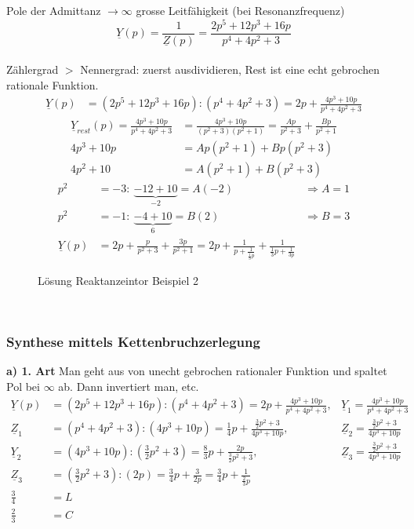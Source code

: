 Pole der Admittanz $\rightarrow \infty$ grosse Leitfähigkeit (bei
Resonanzfrequenz)\\
$$\underline{Y}(p)=\frac{1}{\underline{Z}(p)}=\frac{2p^5+12p^3+16p}{p^4+4p^2+3}$$\\
Zählergrad $>$ Nennergrad: zuerst ausdividieren, Rest ist eine echt gebrochen
rationale Funktion.\\
\begin{align}
\underline{Y}(p)&=(2p^5+12p^3+16p):(p^4+4p^2+3)=2p+\frac{4p^3+10p}{p^4+4p^2+3}\nonumber
\end{align}
\begin{align}
\underline{Y}_{rest}(p)=\frac{4p^3+10p}{p^4+4p^2+3}&=\frac{4p^3+10p}{(p^2+3)(p^2+1)}=\frac{Ap}{p^2+3}+\frac{Bp}{p^2+1}\nonumber\\
4p^3+10p&=Ap(p^2+1)+Bp(p^2+3)\nonumber\\
4p^2+10&=A(p^2+1)+B(p^2+3)\nonumber
\end{align}
\begin{align}
p^2&=-3:\ \underbrace{-12+10}_{-2}=A(-2) &\Rightarrow A=1\nonumber\\
p^2&=-1:\ \underbrace{-4+10}_{6}=B(2) &\Rightarrow B=3\nonumber\\
\underline{Y}(p)&=2p+\frac{p}{p^2+3}+\frac{3p}{p^2+1}=2p+\frac{1}{p+\frac{1}{\frac{1}{3}p}}+\frac{1}{\frac{1}{3}p+\frac{1}{3p}}\nonumber
\end{align}
\begin{figure}[!h]
	\centering
	
	\caption{Lösung Reaktanzeintor Beispiel 2}
	\label{fig:RetSyntheseBsp2L}
\end{figure}\\

\subsubsection{Synthese mittels Kettenbruchzerlegung}
\textbf{a) 1. Art} Man geht aus von unecht gebrochen rationaler Funktion und
spaltet Pol bei $\infty$ ab. Dann invertiert man, etc.\\
\begin{align}
	\underline{Y}(p)&=(2p^5+12p^3+16p):(p^4+4p^2+3)=2p+\frac{4p^3+10p}{p^4+4p^2+3},
	&\underline{Y}_1=\frac{4p^3+10p}{p^4+4p^2+3}\nonumber\\
	\underline{Z}_1&=(p^4+4p^2+3):(4p^3+10p)=\frac{1}{4}p+\frac{\frac{3}{2}p^2+3}{4p^3+10p},
	&\underline{Z}_2=\frac{\frac{3}{2}p^2+3}{4p^3+10p}\nonumber\\
	\underline{Y}_2&=(4p^3+10p):(\frac{3}{2}p^2+3)=\frac{8}{3}p+\frac{2p}{\frac{3}{2}p^2+3},
	&\underline{Z}_3=\frac{\frac{3}{2}p^2+3}{4p^3+10p}\nonumber\\
	\underline{Z}_3&=(\frac{3}{2}p^2+3):(2p)=\frac{3}{4}p+\frac{3}{2p}=\frac{3}{4}p+\frac{1}{\frac{2}{3}p}\nonumber\\ \frac{3}{4}&=L\nonumber\\
	\frac{2}{3}&=C\nonumber
\end{align}